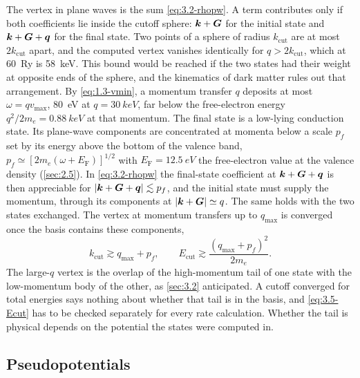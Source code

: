 The vertex in plane waves is the sum \cref{eq:3.2-rhopw}. A term contributes only if both coefficients lie inside the cutoff sphere: $\bm{k}+\bm{G}$ for the initial state and $\bm{k}+\bm{G}+\bm{q}$ for the final state. Two points of a sphere of radius $k_{\mathrm{cut}}$ are at most $2k_{\mathrm{cut}}$ apart, and the computed vertex vanishes identically for $q > 2k_{\mathrm{cut}}$, which at \SI{60}{Ry} is \SI{58}{keV}. This bound would be reached if the two states had their weight at opposite ends of the sphere, and the kinematics of dark matter rules out that arrangement. By \cref{eq:1.3-vmin}, a momentum transfer $q$ deposits at most $\omega = qv_{\mathrm{max}}$, \SI{80}{eV} at $q = \SI{30}{keV}$, far below the free-electron energy $q^2/2m_e = \SI{0.88}{keV}$ at that momentum. The final state is a low-lying conduction state. Its plane-wave components are concentrated at momenta below a scale $p_f$ set by its energy above the bottom of the valence band, $p_f \simeq [2m_e(\omega + E_{\mathrm{F}})]^{1/2}$ with $E_{\mathrm{F}} = \SI{12.5}{eV}$ the free-electron value at the valence density (\cref{sec:2.5}). In \cref{eq:3.2-rhopw} the final-state coefficient at $\bm{k}+\bm{G}+\bm{q}$ is then appreciable for $|\bm{k}+\bm{G}+\bm{q}| \lesssim p_f$, and the initial state must supply the momentum, through its components at $|\bm{k}+\bm{G}| \simeq q$. The same holds with the two states exchanged. The vertex at momentum transfers up to $q_{\mathrm{max}}$ is converged once the basis contains these components,
\begin{equation}
  k_{\mathrm{cut}} \gtrsim q_{\mathrm{max}} + p_f, \qquad
  E_{\mathrm{cut}} \gtrsim \frac{(q_{\mathrm{max}} + p_f)^2}{2m_e} .
  \label{eq:3.5-Ecut}
\end{equation}
The large-$q$ vertex is the overlap of the high-momentum tail of one state with the low-momentum body of the other, as \cref{sec:3.2} anticipated. A cutoff converged for total energies says nothing about whether that tail is in the basis, and \cref{eq:3.5-Ecut} has to be checked separately for every rate calculation. Whether the tail is physical depends on the potential the states were computed in.

\subsection{Pseudopotentials}

